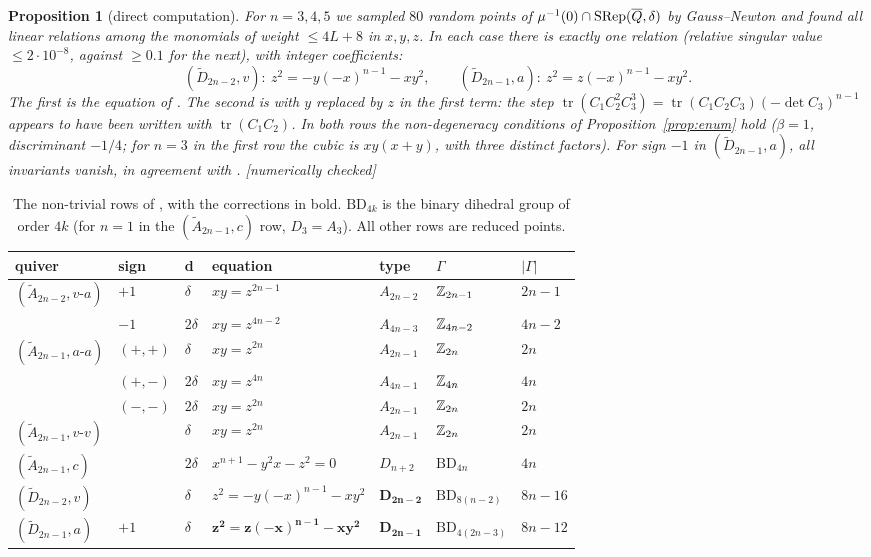 \documentclass[11pt]{article}
\newtheorem{proposition}[theorem]{Proposition}
\theoremstyle{definition}
\theoremstyle{remark}
\newcommand{\tagN}{\textsf{\small[numerically checked]}}
\newcommand{\BD}{\mathrm{BD}}
\begin{document}
\begin{proposition}[direct computation]\label{prop:numeric}
For $n=3,4,5$ we sampled $80$ random points of $\mu^{-1}(0)\cap\mathrm{SRep}(\overline Q,\delta)$ by Gauss--Newton and found all linear relations among the monomials of weight $\le 4L+8$ in $x,y,z$. In each case there is exactly one relation (relative singular value $\le2\cdot10^{-8}$, against $\ge0.1$ for the next), with integer coefficients:
\[
(\widetilde D_{2n-2},v):\ z^2=-y(-x)^{n-1}-xy^2,\qquad (\widetilde D_{2n-1},a):\ z^2=z(-x)^{n-1}-xy^2 .
\]
The first is the equation of \cite[Lemma~3.28]{Pinot}. The second is \cite[Lemma~3.27]{Pinot} with $y$ replaced by $z$ in the first term: the step $\operatorname{tr}(C_1C_2^2C_3^3)=\operatorname{tr}(C_1C_2C_3)(-\det C_3)^{n-1}$ appears to have been written with $\operatorname{tr}(C_1C_2)$. In both rows the non-degeneracy conditions of Proposition~\ref{prop:enum} hold ($\beta=1$, discriminant $-1/4$; for $n=3$ in the first row the cubic is $xy(x+y)$, with three distinct factors). For sign $-1$ in $(\widetilde D_{2n-1},a)$, all invariants vanish, in agreement with \cite{Pinot}. \tagN
\end{proposition}

\begin{table}[h]\centering\small
\begin{tabular}{@{}lllllll@{}}
\toprule
quiver & sign & d & equation & type & $\Gamma$ & $|\Gamma|$\\\midrule
$(\widetilde A_{2n-2},v\text{-}a)$ & $+1$ & $\delta$ & $xy=z^{2n-1}$ & $A_{2n-2}$ & $\mathbb{Z}_{2n-1}$ & $2n-1$\\
 & $-1$ & $2\delta$ & $xy=z^{4n-2}$ & $A_{4n-3}$ & $\mathbb{Z}_{4n-2}$ & $4n-2$\\
$(\widetilde A_{2n-1},a\text{-}a)$ & $(+,+)$ & $\delta$ & $xy=z^{2n}$ & $A_{2n-1}$ & $\mathbb{Z}_{2n}$ & $2n$\\
 & $(+,-)$ & $2\delta$ & $xy=z^{4n}$ & $A_{4n-1}$ & $\mathbb{Z}_{4n}$ & $4n$\\
 & $(-,-)$ & $2\delta$ & $xy=z^{2n}$ & $A_{2n-1}$ & $\mathbb{Z}_{2n}$ & $2n$\\
$(\widetilde A_{2n-1},v\text{-}v)$ & & $\delta$ & $xy=z^{2n}$ & $A_{2n-1}$ & $\mathbb{Z}_{2n}$ & $2n$\\
$(\widetilde A_{2n-1},c)$ & & $2\delta$ & $x^{n+1}-y^2x-z^2=0$ & $D_{n+2}$ & $\BD_{4n}$ & $4n$\\
$(\widetilde D_{2n-2},v)$ & & $\delta$ & $z^2=-y(-x)^{n-1}-xy^2$ & $\mathbf{D_{2n-2}}$ & $\BD_{8(n-2)}$ & $8n-16$\\
$(\widetilde D_{2n-1},a)$ & $+1$ & $\delta$ & $\mathbf{z^2=z(-x)^{n-1}-xy^2}$ & $\mathbf{D_{2n-1}}$ & $\BD_{4(2n-3)}$ & $8n-12$\\\bottomrule
\end{tabular}
\caption{The non-trivial rows of \cite[Thm.~1.2]{Pinot}, with the corrections in bold. $\BD_{4k}$ is the binary dihedral group of order $4k$ (for $n=1$ in the $(\widetilde A_{2n-1},c)$ row, $D_3=A_3$). All other rows are reduced points.}\label{tab:main}
\end{table}
\end{document}
